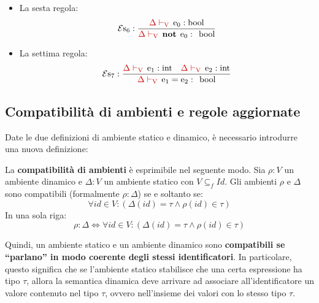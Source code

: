 \documentclass[a4paper]{article}
\newcommand{\dquotes}[1]{``#1''}
\begin{document}
\begin{itemize}
		\item La sesta regola:
		\begin{equation*}
			\mathcal{E}\mathrm{s}_{6}: \dfrac{
				\textcolor{Red3}{\Delta\vdash_{\mathrm{V}}} \:\: \mathrm{e}_{0}:\mathrm{bool}
			}{
				\textcolor{Red3}{\Delta\vdash_{\mathrm{V}}} \:\: \mathbf{not} \:\: \mathrm{e}_{0}: \:\: \mathrm{bool}
			}
		\end{equation*}
	
		\item La settima regola:
		\begin{equation*}
			\mathcal{E}\mathrm{s}_{7} : \dfrac{
				\textcolor{Red3}{\Delta\vdash_{\mathrm{V}}} \:\: \mathrm{e}_{1}:\mathrm{int} \hspace{1em}
				\textcolor{Red3}{\Delta\vdash_{\mathrm{V}}} \:\: \mathrm{e}_{2}:\mathrm{int}
			}{
				\textcolor{Red3}{\Delta\vdash_{\mathrm{V}}} \:\: \mathrm{e}_{1} = \mathrm{e}_{2}: \:\: \mathrm{bool}
			}
		\end{equation*}
	\end{itemize}\newpage
	
	\subsection{Compatibilità di ambienti e regole aggiornate}
	
	Date le due definizioni di ambiente statico e dinamico, è necessario introdurre una nuova definizione:
	\begin{boxdef}
		La \textcolor{Red3}{\textbf{compatibilità di ambienti}} è esprimibile nel seguente modo. Sia $\rho : V$ un ambiente dinamico e $\Delta : V$ un ambiente statico con $V \subseteq_{f} Id$. Gli ambienti $\rho$ e $\Delta$ sono compatibili (formalmente $\rho:\Delta$) se e soltanto se:
		\begin{equation*}
			\forall id \in V : \left( \Delta\left(id\right) = \tau \land \rho\left(id\right) \in \tau \right)
		\end{equation*}
		In una sola riga:
		\begin{equation*}
			\rho : \Delta \iff \forall id \in V : \left( \Delta\left(id\right) = \tau \land \rho\left(id\right) \in \tau \right)
		\end{equation*}
	\end{boxdef}
	
	\noindent
	Quindi, un ambiente statico e un ambiente dinamico sono \textbf{compatibili se \dquotes{parlano} in modo coerente degli stessi identificatori}. In particolare, questo significa che se l'ambiente statico stabilisce che una certa espressione ha tipo $\tau$, allora la semantica dinamica deve arrivare ad associare all'identificatore un valore contenuto nel tipo $\tau$, ovvero nell'insieme dei valori con lo stesso tipo $\tau$.\newline
	
\end{document}
